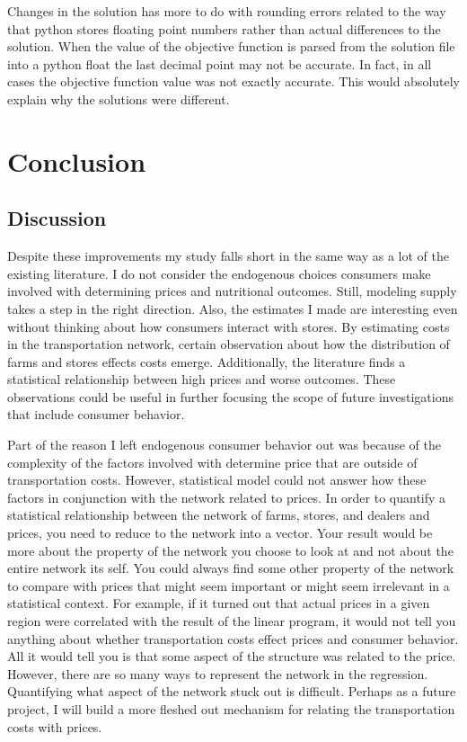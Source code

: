 \documentclass{report}
\begin{document}
Changes in the solution has more to do with rounding errors related to the way that python stores floating point numbers rather than actual differences to the solution. When the value of the objective function is parsed from the solution file into a python float the last decimal point may not be accurate. In fact, in all cases the objective function value was not exactly accurate. This would absolutely explain why the solutions were different.


\chapter{Conclusion}

\section{Discussion}
Despite these improvements my study falls short in the same way as a lot of the existing literature. I do not consider the endogenous choices consumers make involved with determining prices and nutritional outcomes. Still, modeling supply takes a step in the right direction. Also, the estimates I made are interesting even without thinking about how consumers interact with stores. By estimating costs in the transportation network, certain observation about how the distribution of farms and stores effects costs emerge. Additionally, the literature finds a statistical relationship between high prices and worse outcomes. These observations could be useful in further focusing the scope of future investigations that include consumer behavior.

Part of the reason I left endogenous consumer behavior out was because of the complexity of the factors involved with determine price that are outside of transportation costs. However, statistical model could not answer how these factors in conjunction with the network related to prices. In order to quantify a statistical relationship between the network of farms, stores, and dealers and prices, you need to reduce to the network into a vector. Your result would be more about the property of the network you choose to look at and not about the entire network its self. You could always find some other property of the network to compare with prices that might seem important or might seem irrelevant in a statistical context. For example, if it turned out that actual prices in a given region were correlated with the result of the linear program, it would not tell you anything about whether transportation costs effect prices and consumer behavior. All it would tell you is that some aspect of the structure was related to the price. However, there are so many ways to represent the network in the regression. Quantifying what aspect of the network stuck out is difficult. Perhaps as a future project, I will build a more fleshed out mechanism for relating the transportation costs with prices.
\end{document}
